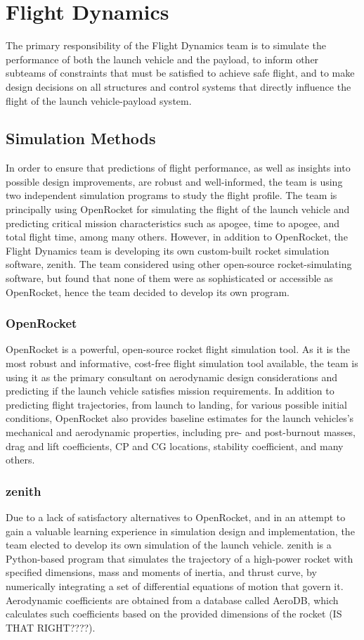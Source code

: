 \chapter{Flight Dynamics}
The primary responsibility of the Flight Dynamics team is to simulate the performance of both the launch vehicle and the payload, to inform other subteams of constraints that must be satisfied to achieve safe flight, and to make design decisions on all structures and control systems that directly influence the flight of the launch vehicle-payload system.

\section{Simulation Methods}
In order to ensure that predictions of flight performance, as well as insights into possible design improvements, are robust and well-informed, the team is using two independent simulation programs to study the flight profile. The team is principally using OpenRocket for simulating the flight of the launch vehicle and predicting critical mission characteristics such as apogee, time to apogee, and total flight time, among many others. However, in addition to OpenRocket, the Flight Dynamics team is developing its own custom-built rocket simulation software, \gls{zenith}. The team considered using other open-source rocket-simulating software, but found that none of them were as sophisticated or accessible as OpenRocket, hence the team decided to develop its own program.  

\subsection{OpenRocket}
OpenRocket is a powerful, open-source rocket flight simulation tool. As it is the most robust and informative, cost-free flight simulation tool available, the team is using it as the primary consultant on aerodynamic design considerations and predicting if the launch vehicle satisfies mission requirements. In addition to predicting flight trajectories, from launch to landing, for various possible initial conditions, OpenRocket also provides baseline estimates for the launch vehicles's mechanical and aerodynamic properties, including pre- and post-burnout masses, drag and lift coefficients, CP and CG locations, stability coefficient, and many others. 
\subsection[ZENITH]{\gls{zenith}}
Due to a lack of satisfactory alternatives to OpenRocket, and in an attempt to gain a valuable learning experience in simulation design and implementation, the team elected to develop its own simulation of the launch vehicle. \gls{zenith} is a Python-based program that simulates the trajectory of a high-power rocket with specified dimensions, mass and moments of inertia, and thrust curve, by numerically integrating a set of differential equations of motion that govern it. Aerodynamic coefficients are obtained from a database called AeroDB, which calculates such coefficients based on the provided dimensions of the rocket (IS THAT RIGHT????).

